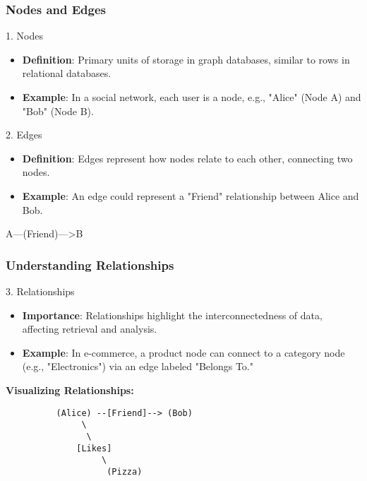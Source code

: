 \documentclass[aspectratio=169]{beamer}
\begin{document}
\begin{frame}[fragile]
    \frametitle{Nodes and Edges}
    \begin{block}{1. Nodes}
        \begin{itemize}
            \item \textbf{Definition}: Primary units of storage in graph databases, similar to rows in relational databases.
            \item \textbf{Example}: In a social network, each user is a node, e.g., "Alice" (Node A) and "Bob" (Node B).
        \end{itemize}
    \end{block}
    
    \begin{block}{2. Edges}
        \begin{itemize}
            \item \textbf{Definition}: Edges represent how nodes relate to each other, connecting two nodes.
            \item \textbf{Example}: An edge could represent a "Friend" relationship between Alice and Bob.
        \end{itemize}
        \begin{center}
            A---(Friend)--->B
        \end{center}
    \end{block}
\end{frame}

\begin{frame}[fragile]
    \frametitle{Understanding Relationships}
    \begin{block}{3. Relationships}
        \begin{itemize}
            \item \textbf{Importance}: Relationships highlight the interconnectedness of data, affecting retrieval and analysis.
            \item \textbf{Example}: In e-commerce, a product node can connect to a category node (e.g., "Electronics") via an edge labeled "Belongs To."
        \end{itemize}
    \end{block}

    \begin{center}
        \textbf{Visualizing Relationships:}
        \begin{verbatim}
          (Alice) --[Friend]--> (Bob)
               \
                \
              [Likes]
                   \
                    (Pizza)
        \end{verbatim}
    \end{center}
\end{frame}
\end{document}
